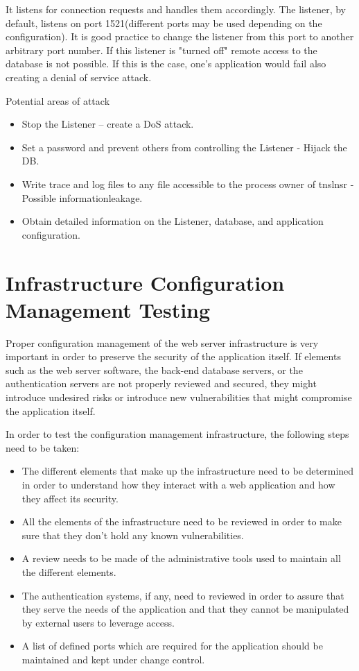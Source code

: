 	It listens for connection requests and handles them accordingly. The listener, by default, 
	listens on port 1521(different ports may be used depending on the configuration). It is
	good practice to change the listener from this port to another arbitrary port number. 
	If this listener is "turned off" remote access to the database is not possible. If this 
	is the case, one’s application would fail also creating a denial of service attack.

	Potential areas of attack
	\begin{itemize}
		\item Stop the Listener -- create a DoS attack.
		\item Set a password and prevent others from controlling the Listener - Hijack the DB.
		\item Write trace and log files to any file accessible to the process owner of tnslnsr 
		- Possible informationleakage.
		\item Obtain detailed information on the Listener, database, and application configuration.
	\end{itemize}



\section{Infrastructure Configuration Management Testing}
	Proper configuration management of the web server infrastructure is very important in order 
	to preserve the security of the application itself. If elements such as the web server 
	software, the back-end database servers, or the authentication servers are not properly reviewed 
	and secured, they might introduce undesired risks or introduce new vulnerabilities that might
	compromise the application itself.

	In order to test the configuration management infrastructure, the following steps need to be taken:
		\begin{itemize}
			\item The different elements that make up the infrastructure need to be determined in 
			order to understand how they interact with a web application and how they affect 
			its security.
			\item All the elements of the infrastructure need to be reviewed in order to make sure 
			that they don’t hold any known vulnerabilities.
			\item A review needs to be made of the administrative tools used to maintain all the 
			different elements.
			\item The authentication systems, if any, need to reviewed in order to assure that 
			they serve the needs of the application and that they cannot be manipulated by external 
			users to leverage access.
			\item A list of defined ports which are required for the application should be maintained 
			and kept under change control.
		\end{itemize}


